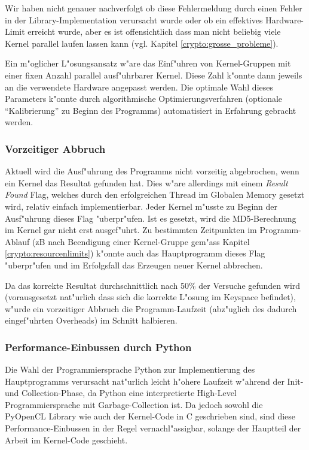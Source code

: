 \begin{refsection}
Wir haben nicht genauer nachverfolgt ob diese Fehlermeldung durch einen Fehler
in der Library-Implementation verursacht wurde oder ob ein effektives
Hardware-Limit erreicht wurde, aber es ist offensichtlich dass man nicht
beliebig viele Kernel parallel laufen lassen kann (vgl. Kapitel
\ref{crypto:grosse_probleme}).

Ein m"oglicher L"osungsansatz w"are das Einf"uhren von Kernel-Gruppen mit einer
fixen Anzahl parallel ausf"uhrbarer Kernel. Diese Zahl k"onnte dann jeweils an
die verwendete Hardware angepasst werden. Die optimale Wahl dieses Parameters
k"onnte durch algorithmische Optimierungsverfahren (optionale ``Kalibrierung''
zu Beginn des Programms) automatisiert in Erfahrung gebracht werden.

\subsubsection{Vorzeitiger Abbruch}

Aktuell wird die Ausf"uhrung des Programms nicht vorzeitig abgebrochen, wenn ein
Kernel das Resultat gefunden hat. Dies w"are allerdings mit einem \textit{Result
Found} Flag, welches durch den erfolgreichen Thread im Globalen Memory gesetzt
wird, relativ einfach implementierbar. Jeder Kernel m"usste zu Beginn der
Ausf"uhrung dieses Flag "uberpr"ufen. Ist es gesetzt, wird die MD5-Berechnung im
Kernel gar nicht erst ausgef"uhrt. Zu bestimmten Zeitpunkten im Programm-Ablauf
(zB nach Beendigung einer Kernel-Gruppe gem"ass Kapitel
\ref{crypto:resourcenlimits}) k"onnte auch das Hauptprogramm dieses Flag
"uberpr"ufen und im Erfolgsfall das Erzeugen neuer Kernel abbrechen.

Da das korrekte Resultat durchschnittlich nach 50\% der Versuche gefunden wird
(vorausgesetzt nat"urlich dass sich die korrekte L"osung im Keyspace befindet),
w"urde ein vorzeitiger Abbruch die Programm-Laufzeit (abz"uglich des dadurch
eingef"uhrten Overheads) im Schnitt halbieren.

\subsubsection{Performance-Einbussen durch Python}

Die Wahl der Programmiersprache Python zur Implementierung des Hauptprogramms
verursacht nat"urlich leicht h"ohere Laufzeit w"ahrend der Init- und
Collection-Phase, da Python eine interpretierte High-Level Programmiersprache
mit Garbage-Collection ist. Da jedoch sowohl die PyOpenCL Library wie auch der
Kernel-Code in C geschrieben sind, sind diese Performance-Einbussen in der Regel
vernachl"assigbar, solange der Hauptteil der Arbeit im Kernel-Code geschieht.


\end{refsection}

